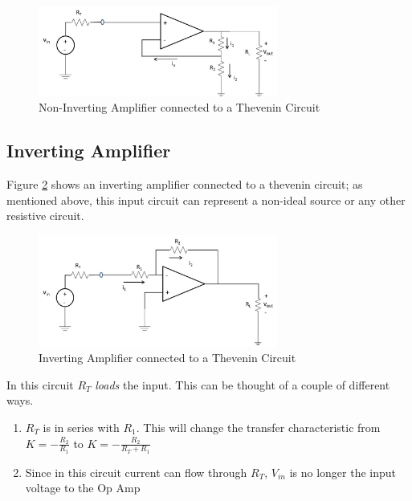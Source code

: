 \documentclass{handout}
\begin{document}
\begin{figure} [h!]
\centering
\includegraphics[width=0.7\textwidth]{NonInvertingAmplifier.jpg}
\caption{Non-Inverting Amplifier connected to a Thevenin Circuit}
\label{fig: NonInvertingAmplifier}
\end{figure}

\subsection{Inverting Amplifier}
Figure \ref{fig: InvertingAmplifier} shows an inverting amplifier connected to a thevenin circuit; as mentioned above, this input circuit can represent a non-ideal source or any other resistive circuit.

\begin{figure} [h!]
\centering
\includegraphics[width=0.7\textwidth]{InvertingAmplifier.jpg}
\caption{Inverting Amplifier connected to a Thevenin Circuit}
\label{fig: InvertingAmplifier}
\end{figure}

In this circuit $R_T$ {\em loads} the input.  This can be thought of a couple of different ways.

\begin{enumerate}
\item $R_T$ is in series with $R_1$.  This will change the transfer characteristic from $K=-\frac{R_2}{R_1}$ to $K=-\frac{R_2}{R_T + R_1}$
\item Since in this circuit current can flow through $R_T$, $V_{in}$ is no longer the input voltage to the Op Amp
\end{enumerate}

\newpage
\clearpage
\pagebreak
\end{document}
